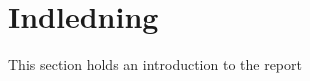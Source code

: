 \section{Indledning} \label{sec:indledning}
This section holds an introduction to the report
\nocite{*}

\newpage
